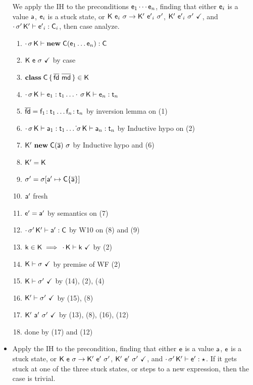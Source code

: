 \documentclass[a4paper,USenglish]{tex/lipics-v2016}
\begin{document}
\begin{itemize}
  We apply the IH to the preconditions ${\sf{e}}_{1} \cdots {\sf{e}}_{n}$, finding that either ${\sf{e}}_{i}$ is a value ${\sf{a}}$, ${\sf{e}}_{i}$ is a stuck state, 
  or ${{\sf{K}}}~{{\sf{e}}_i}~{\sigma} \rightarrow {{\ensuremath{{\sf{K'}}}}}~{{{{\sf{e'}}}}_i}~{{{\sigma'}}}$, ${{\sf{K'}}}~{{{\sf{e'}}}}_i~{{\sigma'}}~\checkmark$, and $\cdot\,{{\sigma'}}\,{{\sf{K'}}}\vdash {{\ensuremath{{\sf{e'}}}}}_i : {\sf{C}}_i$, then case analyze.
  
  \begin{enumerate}
   \item $\cdot\,\sigma\,{\sf{K}}\vdash {\sf{\bf new}}\;{\sf{C}}({\sf{e}}_1\dots{\sf{e}}_n) : {\sf{C}}$ 
   \item ${\sf{K}}~{\sf{e}}~\sigma~\checkmark$  by case  
   \item ${\sf{\bf class}}\;{\sf{C}}\,\{\,\overline{{\sf{fd}}}~\overline{{\sf{md}}}\,\} \in {\sf{K}}$  
   \item $\EnvType \cdot\s\K{\e_1}{\t_1}\dots \EnvType \cdot\s\K{\e_n}{\t_n}$
   \item $\b\fd=\Fdef{\f_1}{\t_1}\dots\Fdef{\f_n}{\t_n}$ by inversion lemma on (1)
   \item $\EnvType \cdot\s\K{\a_1}{\t_1}\dots \EnvType \dot\s\K{\a_n}{\t_n}$ by Inductive hypo on (2)
   \item ${{\sf{K'}}}~{{\sf{\bf new}}\;{\sf{C}}(\overline{{\sf{a}}})~\sigma}$ by Inductive hypo and (6)
   \item ${{\sf{K'}}}={\sf{K}}$
   \item ${{\sigma'}}= \sigma[{\sf{a}}' \mapsto  {\sf{C}}\{\overline{{\sf{a}}}\}] $
   \item ${\sf{a}}'$ fresh
   \item ${{{\sf{e'}}}}={\sf{a}}'$ by semantics on (7)
   \item $\cdot\,{{\sigma'}}\,{{\sf{K'}}}\vdash {\sf{a}}' : {\sf{C}}$ by W10 on (8) and (9)
   \item ${\sf{k}} \in {\sf{K}} \implies \,\cdot\,{\sf{K}}\vdash{\sf{k}} ~\checkmark$ by (2)
   \item ${\sf{K}}\vdash\sigma ~\checkmark$ by premise of WF (2)
   \item ${\sf{K}}\vdash{{\ensuremath{\sigma'}}} ~\checkmark$ by (14), (2), (4)
   \item ${{\sf{K'}}}\vdash{{\ensuremath{\sigma'}}} ~\checkmark$ by (15), (8)
   \item ${{\sf{K'}}}~{\sf{a}}'~{{\sigma'}}~\checkmark$ by (13), (8), (16), (12)
   \item done by (17) and (12)
  \end{enumerate}

  \item {}
  
      Apply the IH to the precondition, finding that either ${\sf{e}}$ is a value ${\sf{a}}$, ${\sf{e}}$ is a stuck state, or ${{\sf{K}}}~{{\sf{e}}}~{\sigma} \rightarrow {{\ensuremath{{\sf{K'}}}}}~{{{{\sf{e'}}}}}~{{{\sigma'}}}$, ${{\sf{K'}}}~{{{\sf{e'}}}}~{{\sigma'}}~\checkmark$, and $\cdot\,{{\sigma'}}\,{{\sf{K'}}}\vdash {{\ensuremath{{\sf{e'}}}}} : \star$. If it gets stuck at one of the three stuck states, or steps to a new expression, then the case is trivial.


\end{itemize}
\end{document}
